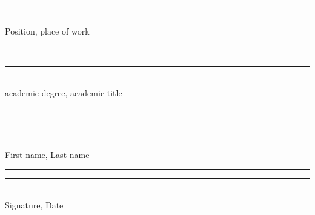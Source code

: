 \begin{titlepage}
\begin{minipage}[t]{0.42\textwidth}
\vspace{0.18cm}
\strut\hseCoSupervisorTitle\\[-0.05cm]
\rule{6.1cm}{0.4pt}\\[-0.05cm]
{\scriptsize Position, place of work}

\vspace{0.08cm}
\strut\hseCoSupervisorDegree\\[-0.05cm]
\rule{6.1cm}{0.4pt}\\[-0.05cm]
{\scriptsize academic degree, academic title}

\vspace{0.08cm}
\strut\hseCoSupervisorName\\[-0.05cm]
\rule{6.1cm}{0.4pt}\\[-0.05cm]
{\scriptsize First name, Last name}

\vspace{0.08cm}
\rule{3.6cm}{0.4pt}\quad\rule{2.2cm}{0.4pt}\\[-0.05cm]
{\scriptsize Signature, Date}
\end{minipage}
\hfill
\begin{minipage}[t]{0.42\textwidth}
\strut
\end{minipage}
\fi

\vfill

\begin{center}
\textbf{\hseCityEn{} \hseYear}
\end{center}
\end{titlepage}


\setcounter{page}{2}
\clearpage

